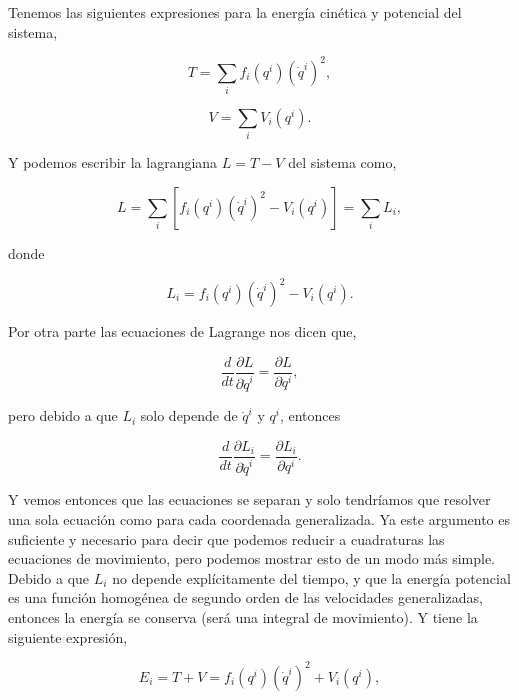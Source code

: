 \documentclass[a4paper,10pt]{article}
\numberwithin{equation}{section}
\begin{document}
Tenemos las siguientes expresiones para la energía cinética y potencial del sistema,

\begin{equation}
 T = \sum_i f_i(q^i)(\dot{q}^i)^2,
 \label{eq:2cinetica1}
\end{equation}

\begin{equation}
 V = \sum_i V_i(q^i).
 \label{eq:2potencial1}
\end{equation}

Y podemos escribir la lagrangiana $L = T - V$ del sistema como,

\begin{equation}
 L = \sum_i \left[ f_i(q^i)(\dot{q}^i)^2 - V_i(q^i)\right] = \sum_i L_i,
\end{equation}

donde

\begin{equation}
 L_i = f_i(q^i)(\dot{q}^i)^2 - V_i(q^i).
\end{equation}

Por otra parte las ecuaciones de Lagrange nos dicen que,

\begin{equation}
 \frac{d}{dt} \frac{\partial L}{\partial \dot{q}^i} = \frac{\partial L}{\partial q^i},
\end{equation}

pero debido a que $L_i$ solo depende de $\dot{q}^i$ y $q^i$, entonces

\begin{equation}
 \frac{d}{dt} \frac{\partial L_i}{\partial \dot{q}^i} = \frac{\partial L_i}{\partial q^i}. 
 \label{eq:3ecdeLagrange1}
\end{equation}

Y vemos entonces que las ecuaciones se separan y solo tendríamos que resolver una sola ecuación
como  para cada coordenada generalizada. Ya este argumento es 
suficiente y necesario para decir que podemos reducir a cuadraturas las ecuaciones de 
movimiento, pero podemos mostrar esto de un modo más simple. Debido a que $L_i$ no 
depende explícitamente del tiempo, y que la energía potencial es una función homogénea 
de segundo orden de las velocidades generalizadas, entonces la energía se conserva (será
una integral de movimiento). Y tiene la siguiente expresión,

\begin{equation}
 E_i = T + V = f_i(q^i)(\dot{q}^i)^2 + V_i(q^i),
 \label{eq:3energtotal1}
\end{equation}
\end{document}
